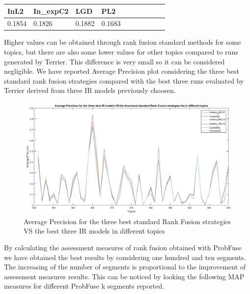 \documentclass[12pt,journal]{IEEEtran}
\begin{document}
\begin{table}[h!]
\centering
\begin{tabular}{|l|l|l|l|l|l|l|l|l|l|}
\hline
InL2   & In\_expC2 & LGD    & PL2        \\ \hline
0.1854 & 0.1826    & 0.1882 & 0.1683      \\ \hline

\end{tabular}
\end{table}


Higher values can be obtained through rank fusion standard methods for some topics, but there are also some lower values for other topics compared to runs generated by Terrier. This difference is very small so it can be considered negligible. We have reported Average Precision plot considering the three best standard rank fusion strategies compared with the best three runs evaluated by Terrier derived from three IR models previously choosen.
\begin{figure}
\includegraphics[scale=0.6]{plot1}
\caption{Average Precision for the three best standard Rank Fusion strategies VS the best three IR models in different topics}
\label{Average Precision for the three best standard Rank Fusion strategies VS the best three IR models in different topics}
\end{figure}

By calculating the assessment measures of rank fusion obtained with ProbFuse we have obtained the best results by considering one hundred and ten segments. \\
The increasing of the number of segments is proportional to the improvement of assessment measures results. This can be noticed by looking the following MAP measures for different ProbFuse k segments reported. 
\end{document}
